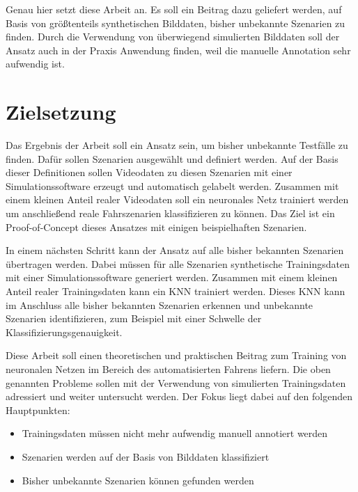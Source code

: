 Genau hier setzt diese Arbeit an. Es soll ein Beitrag dazu geliefert werden, auf Basis von größtenteils synthetischen Bilddaten, bisher unbekannte Szenarien zu finden. Durch die Verwendung von überwiegend simulierten Bilddaten soll der Ansatz auch in der Praxis Anwendung finden, weil die manuelle Annotation sehr aufwendig ist.


\section{Zielsetzung}
\label{einleitung_zielsetzung}

Das Ergebnis der Arbeit soll ein Ansatz sein, um bisher unbekannte Testfälle zu finden. Dafür sollen Szenarien ausgewählt und definiert werden. Auf der Basis dieser Definitionen sollen Videodaten zu diesen Szenarien mit einer Simulationssoftware erzeugt und automatisch gelabelt werden. Zusammen mit einem kleinen Anteil realer Videodaten soll ein neuronales Netz trainiert werden um anschließend reale Fahrszenarien klassifizieren zu können. Das Ziel ist ein Proof-of-Concept dieses Ansatzes mit einigen beispielhaften Szenarien.

In einem nächsten Schritt kann der Ansatz auf alle bisher bekannten Szenarien übertragen werden. Dabei müssen für alle Szenarien synthetische Trainingsdaten mit einer Simulationssoftware generiert werden. Zusammen mit einem kleinen Anteil realer Trainingsdaten kann ein \ac{KNN} trainiert werden. Dieses \ac{KNN} kann im Anschluss alle bisher bekannten Szenarien erkennen und unbekannte Szenarien identifizieren, zum Beispiel mit einer Schwelle der Klassifizierungsgenauigkeit.

Diese Arbeit soll einen theoretischen und praktischen Beitrag zum Training von neuronalen Netzen im Bereich des automatisierten Fahrens liefern. Die oben genannten Probleme sollen mit der Verwendung von simulierten Trainingsdaten adressiert und weiter untersucht werden. Der Fokus liegt dabei auf den folgenden Hauptpunkten:

\begin{itemize}
\item Trainingsdaten müssen nicht mehr aufwendig manuell annotiert werden
\item Szenarien werden auf der Basis von Bilddaten klassifiziert
\item Bisher unbekannte Szenarien können gefunden werden
\end{itemize}

